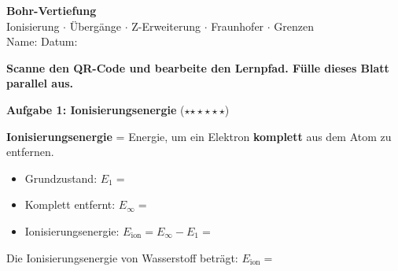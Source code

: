 \documentclass[11pt,a4paper]{article}
\newcommand{\aufgabe}[1]{\textbf{\textcolor{physik}{#1}}}
\newcommand{\luecke}[1]{\underline{\hspace{#1}}}
\newcommand{\niveau}[1]{\textcolor{physik}{\small (#1)}}
\newcommand{\sterne}[1]{\niveau{\ifcase#1\or$\star$\or$\star\star$\or$\star\star\star$\fi}}
\begin{document}
\noindent
\begin{minipage}[t]{0.80\textwidth}
    \vspace{0pt}
    {\Large\bfseries Bohr-Vertiefung}\\[0.3em]
    {\normalsize Ionisierung \(\cdot\) \"Uberg\"ange \(\cdot\) Z-Erweiterung \(\cdot\) Fraunhofer \(\cdot\) Grenzen}\\[0.4em]
    Name: \luecke{5cm} \hfill Datum: \luecke{2.5cm}
\end{minipage}
\hfill
\begin{minipage}[t]{0.16\textwidth}
    \vspace{0pt}
    \raggedleft
    \href{https://devbox42.github.io/sciencesim/physik/kl12-GK/01-photoeffekt/07-DS-bohr-vertiefung/LP-07-bohr-vertiefung.html}{}
\end{minipage}

\vspace{0.2em}
\begin{hinweisbox}
\centering
\textbf{Scanne den QR-Code und bearbeite den Lernpfad. F\"ulle dieses Blatt parallel aus.}
\end{hinweisbox}

\vspace{0.5em}

\aufgabe{Aufgabe 1: Ionisierungsenergie} \sterne{2}

\vspace{0.3em}
\begin{merkbox}
\textbf{Ionisierungsenergie} = Energie, um ein Elektron \textbf{komplett} aus dem Atom zu entfernen.

\vspace{0.3em}
\begin{itemize}
    \item Grundzustand: $E_1 = $ \luecke{2cm}
    \item Komplett entfernt: $E_\infty = $ \luecke{2cm}
    \item Ionisierungsenergie: $E_\text{ion} = E_\infty - E_1 = $ \luecke{3cm}
\end{itemize}

\vspace{0.3em}
Die Ionisierungsenergie von Wasserstoff betr\"agt: $E_\text{ion} = $ \luecke{2cm}
\end{merkbox}
\end{document}
